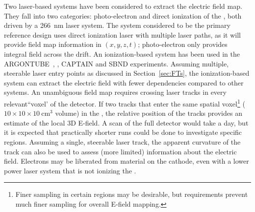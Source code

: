 

Two laser-based systems have been considered to extract the electric field map. They fall into two categories: photo-electron and direct ionization of the , both driven by a \SI{266}{\nano\m} laser system. The system considered to be the primary reference design uses direct ionization laser with multiple laser paths, as it will provide field map information in $(x, y, z, t)$; photo-electron only provides integral field across the drift. An ionization-based system has been used in the ARGONTUBE~\cite{Zeller:2013sva}, , CAPTAIN and SBND experiments. Assuming multiple, steerable laser entry points as discussed in Section~\ref{sec:FTs}, the ionization-based system can extract the electric field with fewer dependencies compared to other systems. An unambiguous field map requires crossing laser tracks in every relevant``voxel' of the detector. If two tracks that enter the same spatial voxel\footnote{Finer sampling in certain regions may be desirable, but  requirements prevent much finer sampling for overall E-field mapping.} ($10 \times 10 \times 10~\textrm{cm}^3$ volume) in the , the relative position of the tracks provides an estimate of the local 3D E-field. A scan of the full detector would take a day, but it is expected that practically shorter runs could be done to investigate specific regions. Assuming a single, steerable laser track, the apparent curvature of the track can also be used to assess (more limited) information about  the electric field. Electrons may be liberated from material on the cathode, even with a lower power laser system that is not ionizing the . 

